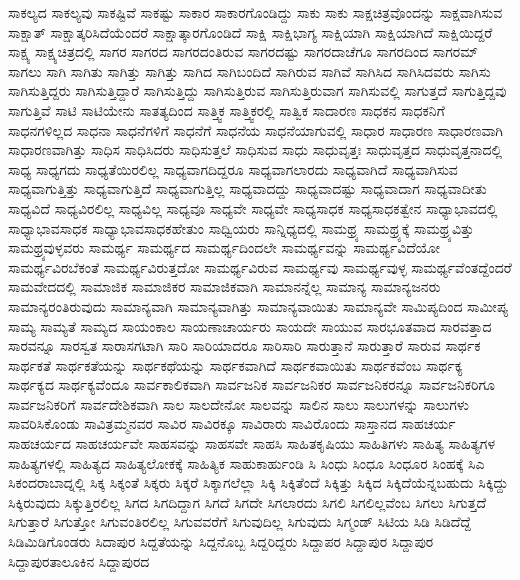 {ಸಾಕಲ್ಯದ
ಸಾಕಲ್ಯವು
ಸಾಕಷ್ಟಿವೆ
ಸಾಕಷ್ಟು
ಸಾಕಾರ
ಸಾಕಾರಗೊಂಡಿದ್ದು
ಸಾಕು
ಸಾಕು
ಸಾಕ್ಷಚಿತ್ರವೊಂದನ್ನು
ಸಾಕ್ಷವಾಗಿಸುವ
ಸಾಕ್ಷಾತ್
ಸಾಕ್ಷಾತ್ಕರಿಸಿದೆಯೆಂದರೆ
ಸಾಕ್ಷಾತ್ಕಾರಗೊಂಡಿದೆ
ಸಾಕ್ಷಿ
ಸಾಕ್ಷಿಭಾಗ್ಯ
ಸಾಕ್ಷಿಯಾಗಿ
ಸಾಕ್ಷಿಯಾಗಿದೆ
ಸಾಕ್ಷಿಯಿದ್ದರೆ
ಸಾಕ್ಷ್ಯ
ಸಾಕ್ಷ್ಯಚಿತ್ರದಲ್ಲಿ
ಸಾಗರ
ಸಾಗರದ
ಸಾಗರದಂತಿರುವ
ಸಾಗರದಷ್ಟು
ಸಾಗರದಾಚೆಗೂ
ಸಾಗರದಿಂದ
ಸಾಗರಮ್
ಸಾಗಲು
ಸಾಗಿ
ಸಾಗಿತು
ಸಾಗಿತ್ತು
ಸಾಗಿತ್ತು	
ಸಾಗಿದ
ಸಾಗಿಬಂದಿದೆ
ಸಾಗಿರುವ
ಸಾಗಿವೆ
ಸಾಗಿಸಿದ
ಸಾಗಿಸಿದವರು
ಸಾಗಿಸು
ಸಾಗಿಸುತ್ತಿದ್ದರು
ಸಾಗಿಸುತ್ತಿದ್ದಾರೆ
ಸಾಗಿಸುತ್ತಿದ್ದು
ಸಾಗಿಸುತ್ತಿರುವ
ಸಾಗಿಸುತ್ತಿರುವಾಗ
ಸಾಗಿಸುವಲ್ಲಿ
ಸಾಗುತ್ತದೆ
ಸಾಗುತ್ತಿದ್ದವು
ಸಾಗುತ್ತಿವೆ
ಸಾಟಿ
ಸಾಟಿಯೇನು
ಸಾತತ್ಯದಿಂದ
ಸಾತ್ತ್ವಿಕ
ಸಾತ್ತ್ವಿಕರಲ್ಲಿ
ಸಾತ್ವಿಕ
ಸಾದಾರಣ
ಸಾಧಕನ
ಸಾಧಕನಿಗೆ
ಸಾಧನಗಳಿಲ್ಲದ
ಸಾಧನಾ
ಸಾಧನೆಗಳಿಗೆ
ಸಾಧನೆಗೆ
ಸಾಧನೆಯ
ಸಾಧನೆಯಾಗುವಲ್ಲಿ
ಸಾಧಾರ
ಸಾಧಾರಣ
ಸಾಧಾರಣವಾಗಿ
ಸಾಧಾರಣವಾಗಿತ್ತು
ಸಾಧಿಸ
ಸಾಧಿಸಿದರು
ಸಾಧಿಸುತ್ತಲೆ
ಸಾಧಿಸುವ
ಸಾಧು
ಸಾಧುವೃತ್ತಃ
ಸಾಧುವೃತ್ತದ
ಸಾಧುವೃತ್ತನಾದಲ್ಲಿ
ಸಾಧ್ಯ
ಸಾಧ್ಯಗದು
ಸಾಧ್ಯತೆಯಿರಲಿಲ್ಲ
ಸಾಧ್ಯವಾಗದಿದ್ದರೂ
ಸಾಧ್ಯವಾಗಲಾರದು
ಸಾಧ್ಯವಾಗಿದೆ
ಸಾಧ್ಯವಾಗಿಸುವ
ಸಾಧ್ಯವಾಗುತ್ತಿತ್ತು
ಸಾಧ್ಯವಾಗುತ್ತಿದೆ
ಸಾಧ್ಯವಾಗುತ್ತಿಲ್ಲ
ಸಾಧ್ಯವಾದದ್ದು
ಸಾಧ್ಯವಾದಷ್ಟು
ಸಾಧ್ಯವಾದಾಗ
ಸಾಧ್ಯವಾದೀತು
ಸಾಧ್ಯವಿದೆ
ಸಾಧ್ಯವಿರಲಿಲ್ಲ
ಸಾಧ್ಯವಿಲ್ಲ
ಸಾಧ್ಯವೂ
ಸಾಧ್ಯವೇ
ಸಾಧ್ಯವೇ
ಸಾಧ್ಯಸಾಧಕ
ಸಾಧ್ಯಸಾಧಕತ್ವೇನ
ಸಾಧ್ಯಾಭಾವದಲ್ಲಿ
ಸಾಧ್ಯಾಭಾವಸಾಧಕ
ಸಾಧ್ಯಾಭಾವಸಾಧಕಹೇತುಂ
ಸಾಧ್ವಿಯರು
ಸಾನ್ನಿಧ್ಯದಲ್ಲಿ
ಸಾಮಥ್ರ್ಯ
ಸಾಮಥ್ರ್ಯಕ್ಕೆ
ಸಾಮಥ್ರ್ಯವಿತ್ತು
ಸಾಮಥ್ರ್ಯವುಳ್ಳವರು
ಸಾಮರ್ಥ್ಯ
ಸಾಮರ್ಥ್ಯದ
ಸಾಮರ್ಥ್ಯದಿಂದಲೇ
ಸಾಮರ್ಥ್ಯವನ್ನು
ಸಾಮರ್ಥ್ಯವಿದೆಯೋ
ಸಾಮರ್ಥ್ಯವಿರಬೆಕಂತೆ
ಸಾಮರ್ಥ್ಯವಿರುತ್ತದೋ
ಸಾಮರ್ಥ್ಯವಿರುವ
ಸಾಮರ್ಥ್ಯವು
ಸಾಮರ್ಥ್ಯವುಳ್ಳ
ಸಾಮರ್ಥ್ಯವೆಂತದ್ದೆಂದರೆ
ಸಾಮವೇದದಲ್ಲಿ
ಸಾಮಾಜಿಕ
ಸಾಮಾಜಿಕರ
ಸಾಮಾಜಿಕವಾಗಿ
ಸಾಮಾನನ್ನೆಲ್ಲ
ಸಾಮಾನ್ಯ
ಸಾಮಾನ್ಯಜನರು
ಸಾಮಾನ್ಯರಂತಿರುವುದು
ಸಾಮಾನ್ಯವಾಗಿ
ಸಾಮಾನ್ಯವಾಗಿತ್ತು
ಸಾಮಾನ್ಯವಾಯಿತು
ಸಾಮಾನ್ಯವೇ
ಸಾಮಿಪ್ಯದಿಂದ
ಸಾಮೀಪ್ಯ
ಸಾಮ್ಯ
ಸಾಮ್ಯತೆ
ಸಾಮ್ಯದ
ಸಾಯಂಕಾಲ
ಸಾಯಣಾಚಾರ್ಯರು
ಸಾಯದೇ
ಸಾಯುವ
ಸಾರಭೂತವಾದ
ಸಾರವತ್ತಾದ
ಸಾರವನ್ನೂ
ಸಾರಸ್ವತ
ಸಾರಾಸಗಟಾಗಿ
ಸಾರಿ
ಸಾರಿಯಾದರೂ
ಸಾರಿಸಾರಿ
ಸಾರುತ್ತಾನೆ
ಸಾರುತ್ತಾರೆ
ಸಾರುವ
ಸಾರ್ಥಕ
ಸಾರ್ಥಕತೆ
ಸಾರ್ಥಕತೆಯನ್ನು
ಸಾರ್ಥಕಥೆಯನ್ನು
ಸಾರ್ಥಕವಾಗಿದೆ
ಸಾರ್ಥಕವಾಯಿತು
ಸಾರ್ಥಕವೆಂಬ
ಸಾರ್ಥಕ್ಯ
ಸಾರ್ಥಕ್ಯದ
ಸಾರ್ಥಕ್ಯವೆಂದೂ
ಸಾರ್ವಕಾಲಿಕವಾಗಿ
ಸಾರ್ವಜನಿಕ
ಸಾರ್ವಜನಿಕರ
ಸಾರ್ವಜನಿಕರನ್ನೂ
ಸಾರ್ವಜನಿಕರಿಗೂ
ಸಾರ್ವಜನಿಕರಿಗೆ
ಸಾರ್ವದೇಶಿಕವಾಗಿ
ಸಾಲ
ಸಾಲದೇನೋ
ಸಾಲವನ್ನು
ಸಾಲಿನ
ಸಾಲು
ಸಾಲುಗಳನ್ನು
ಸಾಲುಗಳು
ಸಾವರಿಸಿಕೊಂಡು
ಸಾವಿತ್ರಮ್ಮನವರ
ಸಾವಿರ
ಸಾವಿರಕ್ಕೂ
ಸಾವಿರಾರು
ಸಾವಿರೊಂದು
ಸಾಸ್ತಾನದ
ಸಾಹಚರ್ಯ
ಸಾಹಚರ್ಯದ
ಸಾಹಚರ್ಯವೇ
ಸಾಹಸವನ್ನು
ಸಾಹಸವೇ
ಸಾಹಸಿ
ಸಾಹಿತಕೃಷಿಯು
ಸಾಹಿತಿಗಳು
ಸಾಹಿತ್ಯ
ಸಾಹಿತ್ಯಗಳ
ಸಾಹಿತ್ಯಗಳಲ್ಲಿ
ಸಾಹಿತ್ಯದ
ಸಾಹಿತ್ಯಲೋಕಕ್ಕೆ
ಸಾಹಿತ್ಯಿಕ
ಸಾಹುಕಾರ್ಹುಂಡಿ
ಸಿ
ಸಿಂಧು
ಸಿಂಧೂ
ಸಿಂಧೂರ
ಸಿಂಹಕ್ಕೆ
ಸಿಎ
ಸಿಕಂದರಾಬಾದ್ನಲ್ಲಿ
ಸಿಕ್ಕ
ಸಿಕ್ಕಂತೆ
ಸಿಕ್ಕರು
ಸಿಕ್ಕರೆ
ಸಿಕ್ಕಾಗಲೆಲ್ಲಾ
ಸಿಕ್ಕಿ
ಸಿಕ್ಕಿತೆಂದೆ
ಸಿಕ್ಕಿತ್ತು
ಸಿಕ್ಕಿದ
ಸಿಕ್ಕಿದೆಯೆನ್ನಬಹುದು
ಸಿಕ್ಕಿದ್ದು
ಸಿಕ್ಕಿರುವುದು
ಸಿಕ್ಕುತ್ತಿರಲಿಲ್ಲ
ಸಿಗದ
ಸಿಗದಿದ್ದಾಗ
ಸಿಗದೆ
ಸಿಗದೇ
ಸಿಗಲಾರದು
ಸಿಗಲಿ
ಸಿಗಲಿಲ್ಲವೆಂಬ
ಸಿಗಲು
ಸಿಗುತ್ತದೆ
ಸಿಗುತ್ತಾರೆ
ಸಿಗುತ್ತೋ
ಸಿಗುವಂತಿರಲಿಲ್ಲ
ಸಿಗುವವರೆಗೆ
ಸಿಗುವುದಿಲ್ಲ
ಸಿಗುವುದು
ಸಿಗ್ಮಂಡ್
ಸಿಟಿಯ
ಸಿಡಿ
ಸಿಡಿದೆದ್ದೆ
ಸಿಡಿಮಿಡಿಗೊಂಡರು
ಸಿದಾಪುರ
ಸಿದ್ದತೆಯನ್ನು
ಸಿದ್ದನೊಬ್ಬ
ಸಿದ್ದರಿದ್ದರು
ಸಿದ್ದಾಪರ
ಸಿದ್ದಾಪುರ
ಸಿದ್ದಾಪುರ	
ಸಿದ್ದಾಪುರತಾಲೂಕಿನ
ಸಿದ್ದಾಪುರದ
}
